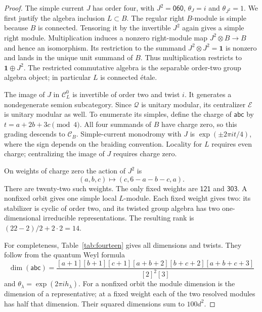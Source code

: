 \documentclass[11pt]{amsart}
\theoremstyle{remark}
\newcommand{\C}{\mathcal C}
\newcommand{\E}{\mathcal E}
\newcommand{\Q}{\mathcal Q}
\newcommand{\wt}[1]{\mathsf{#1}}
\newcommand{\one}{\mathbf 1}
\begin{document}
\begin{proof}
The simple current $J$ has order four, with $J^2=\wt{060}$,
$\theta_J=i$ and $\theta_{J^2}=1$. We first justify the algebra
inclusion $L\subset B$. The regular right $B$-module is simple because
$B$ is connected. Tensoring it by the invertible $J^2$ again gives a
simple right module. Multiplication induces a nonzero right-module map
$J^2\otimes B\to B$ and hence an isomorphism. Its restriction to the
summand $J^2\otimes J^2=\one$ is nonzero and lands in the unique unit
summand of $B$. Thus multiplication restricts to $\one\oplus J^2$.
The restricted commutative algebra is the separable order-two group
algebra object; in particular $L$ is connected \'etale.

The image of $J$ in $\C_L^0$ is invertible of order two and twist $i$.
It generates a nondegenerate semion subcategory. Since $\Q$ is unitary
modular, its centralizer $\E$ is unitary modular as well.
To enumerate its simples, define the charge of $\wt{abc}$ by
$t=a+2b+3c\pmod4$. All four summands of $B$ have charge zero, so this
grading descends to $\C_B$. Simple-current monodromy with $J$ is
$\exp(\pm2\pi i t/4)$, where the sign depends on the braiding
convention. Locality for $L$ requires even charge; centralizing the
image of $J$ requires charge zero.

On weights of charge zero the action of $J^2$ is
\[
 (a,b,c)\longmapsto(c,6-a-b-c,a).
\]
There are twenty-two such weights. The only fixed weights are
$\wt{121}$ and $\wt{303}$. A nonfixed orbit gives one simple local
$L$-module. Each fixed weight gives two: its stabilizer is cyclic of
order two, and its twisted group algebra has two one-dimensional
irreducible representations. The resulting rank is
$(22-2)/2+2\cdot2=14$.

For completeness, Table~\ref{tab:fourteen} gives all dimensions and
twists. They follow from the quantum Weyl formula
\[
 \dim(\wt{abc})=
 \frac{[a+1][b+1][c+1][a+b+2][b+c+2][a+b+c+3]}{[2]^2[3]}
\]
and $\theta_\lambda=\exp(2\pi i h_\lambda)$. For a nonfixed orbit the
module dimension is the dimension of a representative; at a fixed
weight each of the two resolved modules has half that dimension.
Their squared dimensions sum to $100d^2$.


\end{proof}
\end{document}

